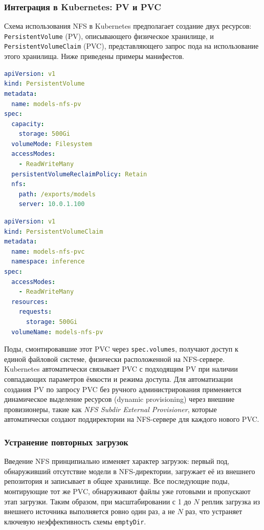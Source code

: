 \subsubsection*{Интеграция в Kubernetes: PV и PVC}

Схема использования NFS в Kubernetes предполагает создание двух ресурсов: \texttt{PersistentVolume} (PV), описывающего физическое хранилище, и \texttt{PersistentVolumeClaim} (PVC), представляющего запрос пода на использование этого хранилища. Ниже приведены примеры манифестов.

\begin{lstlisting}[language=yaml, caption={PersistentVolume на базе NFS}]
apiVersion: v1
kind: PersistentVolume
metadata:
  name: models-nfs-pv
spec:
  capacity:
    storage: 500Gi
  volumeMode: Filesystem
  accessModes:
    - ReadWriteMany
  persistentVolumeReclaimPolicy: Retain
  nfs:
    path: /exports/models
    server: 10.0.1.100
\end{lstlisting}

\begin{lstlisting}[language=yaml, caption={PersistentVolumeClaim для NFS-тома}]
apiVersion: v1
kind: PersistentVolumeClaim
metadata:
  name: models-nfs-pvc
  namespace: inference
spec:
  accessModes:
    - ReadWriteMany
  resources:
    requests:
      storage: 500Gi
  volumeName: models-nfs-pv
\end{lstlisting}

Поды, смонтировавшие этот PVC через \texttt{spec.volumes}, получают доступ к единой файловой системе, физически расположенной на NFS-сервере. Kubernetes автоматически связывает PVC с подходящим PV при наличии совпадающих параметров ёмкости и режима доступа. Для автоматизации создания PV по запросу PVC без ручного администрирования применяется динамическое выделение ресурсов (dynamic provisioning) через внешние провизионеры, такие как \textit{NFS Subdir External Provisioner}, которые автоматически создают поддиректории на NFS-сервере для каждого нового PVC.

\subsubsection*{Устранение повторных загрузок}

Введение NFS принципиально изменяет характер загрузок: первый под, обнаруживший отсутствие модели в NFS-директории, загружает её из внешнего репозитория и записывает в общее хранилище. Все последующие поды, монтирующие тот же PVC, обнаруживают файлы уже готовыми и пропускают этап загрузки. Таким образом, при масштабировании с 1 до $N$ реплик загрузка из внешнего источника выполняется ровно один раз, а не $N$ раз, что устраняет ключевую неэффективность схемы \texttt{emptyDir}.

